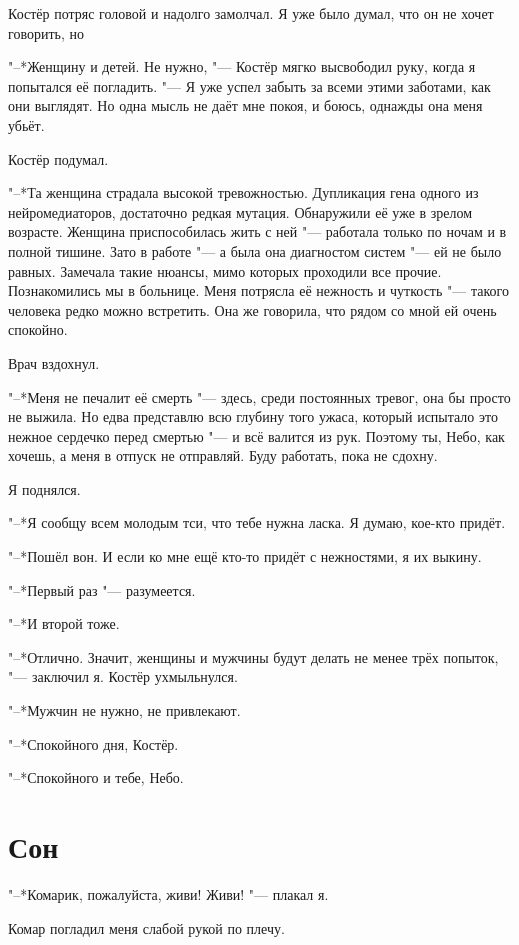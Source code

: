 \documentclass[a4paper,10pt,fleqn]{book}
\newcommand{\ldotst}{\so{...}\xspace}
\begin{document}
Костёр потряс головой и надолго замолчал.
Я уже было думал, что он не хочет говорить, но\ldotst

"--*Женщину и детей.
Не нужно, "--- Костёр мягко высвободил руку, когда я попытался её погладить.
"--- Я уже успел забыть за всеми этими заботами, как они выглядят.
Но одна мысль не даёт мне покоя, и боюсь, однажды она меня убьёт.

Костёр подумал.

"--*Та женщина страдала высокой тревожностью.
Дупликация гена одного из нейромедиаторов, достаточно редкая мутация.
Обнаружили её уже в зрелом возрасте.
Женщина приспособилась жить с ней "--- работала только по ночам и в полной тишине.
Зато в работе "--- а была она диагностом систем "--- ей не было равных.
Замечала такие нюансы, мимо которых проходили все прочие.
Познакомились мы в больнице.
Меня потрясла её нежность и чуткость "--- такого человека редко можно встретить.
Она же говорила, что рядом со мной ей очень спокойно.

Врач вздохнул.

"--*Меня не печалит её смерть "--- здесь, среди постоянных тревог, она бы просто не выжила.
Но едва представлю всю глубину того ужаса, который испытало это нежное сердечко перед смертью "--- и всё валится из рук.
Поэтому ты, Небо, как хочешь, а меня в отпуск не отправляй.
Буду работать, пока не сдохну.

Я поднялся.

"--*Я сообщу всем молодым тси, что тебе нужна ласка.
Я думаю, кое-кто придёт.

"--*Пошёл вон.
И если ко мне ещё кто-то придёт с нежностями, я их выкину.

"--*Первый раз "--- разумеется.

"--*И второй тоже.

"--*Отлично.
Значит, женщины и мужчины будут делать не менее трёх попыток, "--- заключил я.
Костёр ухмыльнулся.

"--*Мужчин не нужно, не привлекают.

"--*Спокойного дня, Костёр.

"--*Спокойного и тебе, Небо.

\section{Сон}

"--*Комарик, пожалуйста, живи!
Живи! "--- плакал я.

Комар погладил меня слабой рукой по плечу.
\end{document}
